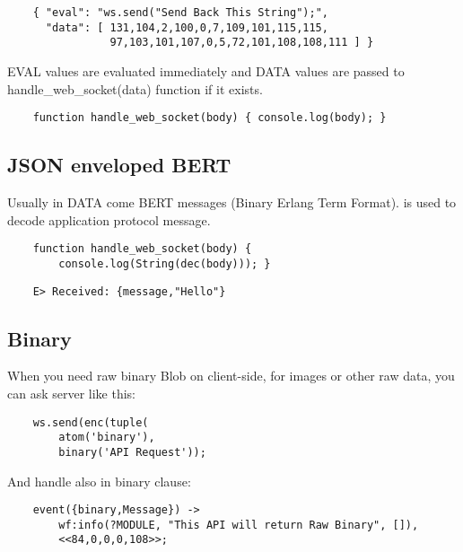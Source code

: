 \begin{lstlisting}
    { "eval": "ws.send("Send Back This String");",
      "data": [ 131,104,2,100,0,7,109,101,115,115,
                97,103,101,107,0,5,72,101,108,108,111 ] }
\end{lstlisting}

EVAL values are evaluated immediately and DATA values are passed
to handle\_web\_socket(data) function if it exists.

\begin{lstlisting}
    function handle_web_socket(body) { console.log(body); }
\end{lstlisting}

\subsection*{JSON enveloped BERT}

Usually in DATA come BERT messages (Binary Erlang Term Format).
is used to decode application protocol message.

\begin{lstlisting}
    function handle_web_socket(body) {
        console.log(String(dec(body))); }
\end{lstlisting}

\begin{lstlisting}
    E> Received: {message,"Hello"}
\end{lstlisting}

\subsection{Binary}

When you need raw binary Blob on client-side,
for images or other raw data, you can ask server like this:

\vspace{1\baselineskip}
\begin{lstlisting}
    ws.send(enc(tuple(
        atom('binary'),
        binary('API Request'));
\end{lstlisting}
\vspace{1\baselineskip}

And handle also in binary clause:

\vspace{1\baselineskip}
\begin{lstlisting}
    event({binary,Message}) ->
        wf:info(?MODULE, "This API will return Raw Binary", []),
        <<84,0,0,0,108>>;
\end{lstlisting}
\vspace{1\baselineskip}

